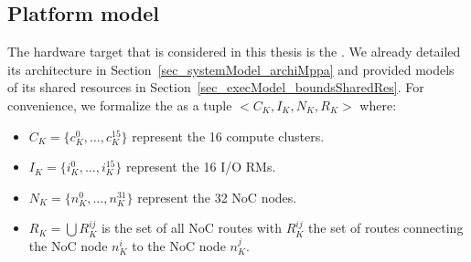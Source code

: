 \documentclass[main.tex]{subfiles}
\begin{document}
\subsection{Platform model}
\label{ssec_framework_hwModel}
The hardware target that is considered in this thesis is the \mppalong. We
already detailed its architecture in Section~\ref{sec_systemModel_archiMppa}
and provided models of its shared resources in
Section~\ref{sec_execModel_boundsSharedRes}. For convenience, we formalize the
\mppalong as a tuple $< C_K , I_K , N_K, R_K >$ where:
\begin{itemize}
    \item $C_K = \{ c_K^0 , \ldots , c_K^{15} \}$ represent the 16 compute clusters.
    \item $I_K = \{ i_K^0 , \ldots , i_K^{15} \}$ represent the 16 I/O RMs.
    \item $N_K = \{ n_K^0 , \ldots , n_K^{31} \}$ represent the 32 NoC nodes.
    \item $R_K = \bigcup R_K^{ij}$ is the set of all NoC routes with $R_K^{ij}$
the set of routes connecting the NoC node $n_K^i$ to the NoC node $n_K^j$.
\end{itemize}
\end{document}
